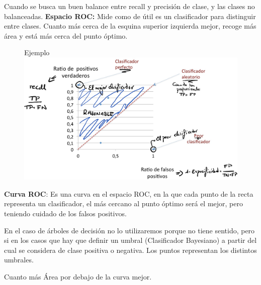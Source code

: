\documentclass[12pt, twoside, openright]{report} %
\begin{document}
Cuando se busca un buen balance entre recall y precisión de clase, y las
clases no balanceadas.
\newpage
\textbf{Espacio ROC:} Mide como de útil es un clasificador para
distinguir entre clases. Cuanto más cerca de la esquina superior
izquierda mejor, recoge más área y está más cerca del punto óptimo.
\begin{figure}[H]
	Ejemplo
	{\includegraphics[scale=.2]{Untitled 12.png}}
\end{figure}
\textbf{Curva ROC}: Es una curva en el espacio ROC, en la que cada punto
de la recta representa un clasificador, el más cercano al punto óptimo
será el mejor, pero teniendo cuidado de los falsos positivos.

En el caso de árboles de decisión no lo utilizaremos porque no tiene 
sentido, pero si en los casos que hay que definir un umbral 
(Clasificador Bayesiano) a partir del cual se considera de clase positiva 
o negativa. Los puntos representan los distintos umbrales.

Cuanto más Área por debajo de la curva mejor.
\end{document}
